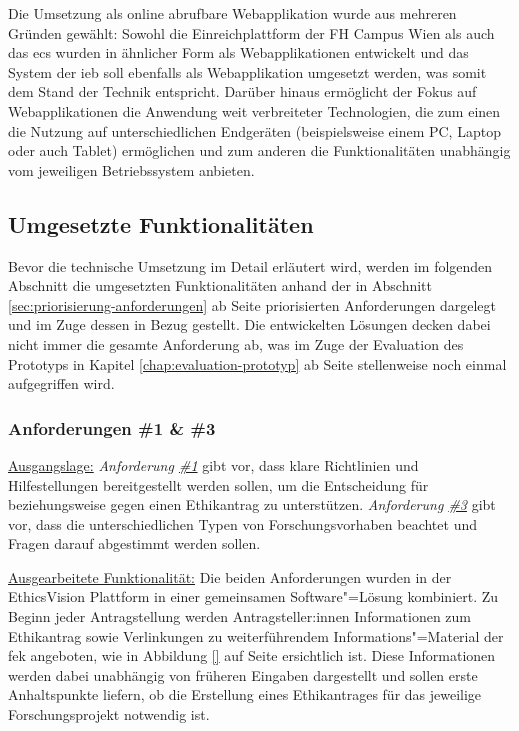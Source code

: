 \documentclass[a4paper,12pt,twoside]{scrreprt}
\begin{document}
Die Umsetzung als online abrufbare Webapplikation wurde aus mehreren Gründen gewählt: Sowohl die Einreichplattform der FH Campus Wien als auch das \acl{ecs} wurden in ähnlicher Form als Webapplikationen entwickelt und das System der \ac{ieb} soll ebenfalls als Webapplikation umgesetzt werden, was somit dem Stand der Technik entspricht. Darüber hinaus ermöglicht der Fokus auf Webapplikationen die Anwendung weit verbreiteter Technologien, die zum einen die Nutzung auf unterschiedlichen Endgeräten (beispielsweise einem PC, Laptop oder auch Tablet) ermöglichen und zum anderen die Funktionalitäten unabhängig vom jeweiligen Betriebssystem anbieten.

\subsection{Umgesetzte Funktionalitäten}
\label{sub-sec:umgesetzte-funtionalitäten}

Bevor die technische Umsetzung im Detail erläutert wird, werden im folgenden Abschnitt die umgesetzten Funktionalitäten anhand der in Abschnitt \ref{sec:priorisierung-anforderungen} ab Seite \pageref{sec:priorisierung-anforderungen} priorisierten Anforderungen dargelegt und im Zuge dessen in Bezug gestellt. Die entwickelten Lösungen decken dabei nicht immer die gesamte Anforderung ab, was im Zuge der Evaluation des Prototyps in Kapitel \ref{chap:evaluation-prototyp} ab Seite \pageref{chap:evaluation-prototyp} stellenweise noch einmal aufgegriffen wird.

\subsubsection*{Anforderungen \#1 \& \#3}
\label{sub-sub-sec:umgesetzte-funktionalitäten-anforderung-1-3}

\underline{Ausgangslage:} \textit{Anforderung \hyperref[sub-sub-sec:abgeleitete-anforderungen-vorfeld-antrag]{\#1}} gibt vor, dass klare Richtlinien und Hilfestellungen bereitgestellt werden sollen, um die Entscheidung für beziehungsweise gegen einen Ethikantrag zu unterstützen. \textit{Anforderung \hyperref[sub-sub-sec:abgeleitete-anforderungen-während-erstellung-einreichung]{\#3}} gibt vor, dass die unterschiedlichen Typen von Forschungsvorhaben beachtet und Fragen darauf abgestimmt werden sollen.

\medskip

\noindent\underline{Ausgearbeitete Funktionalität:} Die beiden Anforderungen wurden in der EthicsVision Plattform in einer gemeinsamen Software"=Lösung kombiniert. Zu Beginn jeder Antragstellung werden Antragsteller:innen Informationen zum Ethikantrag sowie Verlinkungen zu weiterführendem Informations"=Material der \ac{fek} angeboten, wie in Abbildung \ref{} auf Seite \pageref{} ersichtlich ist. Diese Informationen werden dabei unabhängig von früheren Eingaben dargestellt und sollen erste Anhaltspunkte liefern, ob die Erstellung eines Ethikantrages für das jeweilige Forschungsprojekt notwendig ist.
\end{document}
